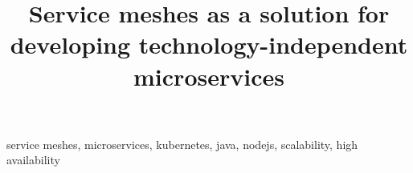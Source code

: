 \documentclass[conference]{IEEEtran}
\begin{document}
\title{Service meshes as a solution for developing technology-independent microservices
}



\maketitle
\thispagestyle{plain}
\pagestyle{plain}



\begin{IEEEkeywords}
service meshes, microservices, kubernetes, java, nodejs, scalability, high availability
\end{IEEEkeywords}










\end{document}
